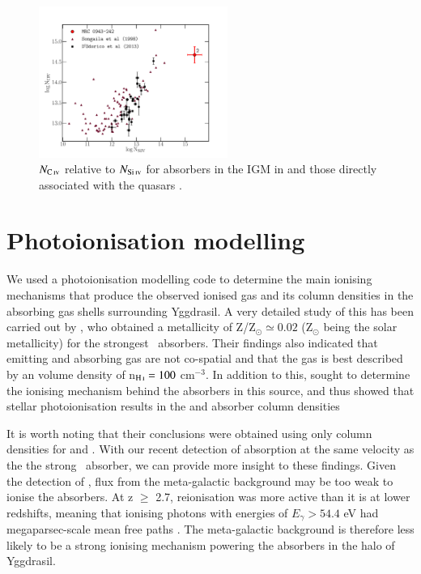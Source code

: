 \begin{figure} 
\centering
\includegraphics[width=0.55\textwidth]{plots_chp3/SiIV_CIV_QSO_HzRGs.pdf}
\caption[$N_\ion{C}{IV}$ and $N_\ion{Si}{IV}$ column densities of host galaxy and quasar absorbers]{$N_\ion{C}{IV}$ relative to $N_\ion{Si}{IV}$ for absorbers in the IGM in \citet{songaila1998} and those directly associated with the quasars \citep{dodorico2013}.}
\label{fig:SiIV-quasar-absorption}
\end{figure}

\section{Photoionisation modelling}\label{section:photoionisation-modelling}
We used a photoionisation modelling code to determine the main ionising mechanisms that produce the observed ionised gas and its column densities in the absorbing gas shells surrounding Yggdrasil. A very detailed study of this has been carried out by \citet{binette2000}, who obtained a metallicity of Z/Z$_\odot \simeq 0.02$ (Z$_\odot$ being the solar metallicity) for the strongest \lya~absorbers. Their findings also indicated that emitting and absorbing gas are not co-spatial and that the gas is best described by an  volume density of n$_\ion{H}{I} = 100$ cm$^{-3}.$ In addition to this, \citet{binette2006} sought to determine the ionising mechanism behind the absorbers in this source, and thus showed that stellar photoionisation results in the  and  absorber column densities 

It is worth noting that their conclusions were obtained using only column densities for  and . With our recent detection of  absorption at the same velocity as the the strong \lya~absorber, we can provide more insight to these findings. Given the detection of , flux from the meta-galactic background may be too weak to ionise the absorbers. At z $\geq$ 2.7,  reionisation was more active than it is at lower redshifts, meaning that ionising photons with energies of $E_\gamma > 54.4$ eV had megaparsec-scale mean free paths \citep{shull2010,mcquinn2016}. The meta-galactic background is therefore less likely to be a strong ionising mechanism powering the absorbers in the halo of Yggdrasil. 

